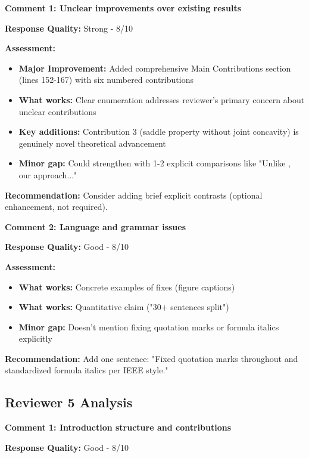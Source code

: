 \documentclass[11pt]{article}
\begin{document}
\textbf{Comment 1: Unclear improvements over existing results}

\textbf{Response Quality:} \textcolor{success}{Strong - 8/10}

\textbf{Assessment:}
\begin{itemize}[leftmargin=*]
\item \textbf{Major Improvement:} Added comprehensive Main Contributions section (lines 152-167) with six numbered contributions
\item \textbf{What works:} Clear enumeration addresses reviewer's primary concern about unclear contributions
\item \textbf{Key additions:} Contribution 3 (saddle property without joint concavity) is genuinely novel theoretical advancement
\item \textbf{Minor gap:} Could strengthen with 1-2 explicit comparisons like "Unlike \cite{bental2009}, our approach..."
\end{itemize}

\textbf{Recommendation:} Consider adding brief explicit contrasts (optional enhancement, not required).

\vspace{0.3cm}

\textbf{Comment 2: Language and grammar issues}

\textbf{Response Quality:} \textcolor{success}{Good - 8/10}

\textbf{Assessment:}
\begin{itemize}[leftmargin=*]
\item \textbf{What works:} Concrete examples of fixes (figure captions)
\item \textbf{What works:} Quantitative claim ("30+ sentences split")
\item \textbf{Minor gap:} Doesn't mention fixing quotation marks or formula italics explicitly
\end{itemize}

\textbf{Recommendation:} Add one sentence: "Fixed quotation marks throughout and standardized formula italics per IEEE style."

\subsection{Reviewer 5 Analysis}

\textbf{Comment 1: Introduction structure and contributions}

\textbf{Response Quality:} \textcolor{success}{Good - 8/10}
\end{document}
